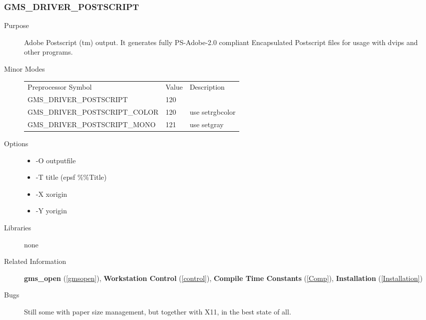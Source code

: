 \subsubsection{GMS\_DRIVER\_POSTSCRIPT\label{ps}}
\begin{description}
\item[Purpose]\mbox{}


Adobe Postscript (tm) output.
It generates fully PS-Adobe-2.0 compliant Encapsulated Postscript 
files for usage with dvips and other programs.
\item[Minor Modes]\mbox{}


\begin{center}
\begin{tabular}{lll}\hline
Preprocessor Symbol & Value& Description\\ 
GMS\_DRIVER\_POSTSCRIPT &  120& \\ 
GMS\_DRIVER\_POSTSCRIPT\_COLOR &  120& use setrgbcolor \\ 
GMS\_DRIVER\_POSTSCRIPT\_MONO &  121& use setgray\\ 
\hline\end{tabular}
\end{center}

\item[Options]\mbox{}


\begin{itemize}
\item  -O outputfile
\item  -T title (epsf \%\%Title)
\item  -X xorigin   
\item  -Y yorigin 
\end{itemize}

\item[Libraries]\mbox{}


none
\item[Related Information]\mbox{}


{\bf gms\_open} (\ref{gmsopen}), 
{\bf Workstation Control} (\ref{control}), 
{\bf Compile Time Constants} (\ref{Comp}), 
{\bf Installation} (\ref{Installation}) 
\item[Bugs]\mbox{}


Still some with paper size management, but together with X11, 
in the best state of all.
\end{description}



\newpage



